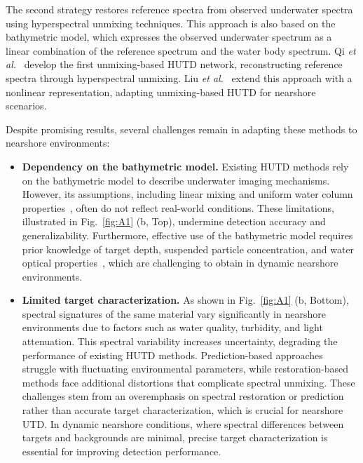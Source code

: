 \par  
The second strategy restores reference spectra from observed underwater spectra using hyperspectral unmixing techniques.  
This approach is also based on the bathymetric model, which expresses the observed underwater spectrum as a linear combination of the reference spectrum and the water body spectrum.  
Qi \emph{et al.}~\cite{Qi2021} develop the first unmixing-based HUTD network, reconstructing reference spectra through hyperspectral unmixing.  
Liu \emph{et al.}~\cite{Liu2024} extend this approach with a nonlinear representation, adapting unmixing-based HUTD for nearshore scenarios.  

\par  
Despite promising results, several challenges remain in adapting these methods to nearshore environments:  
\begin{itemize}  
    \item \textbf{Dependency on the bathymetric model.}  
    Existing HUTD methods rely on the bathymetric model to describe underwater imaging mechanisms.  
    However, its assumptions, including linear mixing and uniform water column properties~\cite{Lee1998}, often do not reflect real-world conditions.  
    These limitations, illustrated in Fig.~\ref{fig:A1} (b, Top), undermine detection accuracy and generalizability.  
    Furthermore, effective use of the bathymetric model requires prior knowledge of target depth, suspended particle concentration, and water optical properties~\cite{Gillis2020}, which are challenging to obtain in dynamic nearshore environments.  

    \item \textbf{Limited target characterization.}  
    As shown in Fig.~\ref{fig:A1} (b, Bottom), spectral signatures of the same material vary significantly in nearshore environments due to factors such as water quality, turbidity, and light attenuation.  
    This spectral variability increases uncertainty, degrading the performance of existing HUTD methods.  
    Prediction-based approaches struggle with fluctuating environmental parameters, while restoration-based methods face additional distortions that complicate spectral unmixing.  
    These challenges stem from an overemphasis on spectral restoration or prediction rather than accurate target characterization, which is crucial for nearshore UTD.  
    In dynamic nearshore conditions, where spectral differences between targets and backgrounds are minimal, precise target characterization is essential for improving detection performance.  
\end{itemize}  


